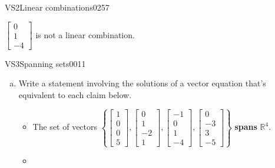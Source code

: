 \begin{exercise}{VS2}{Linear combinations}{0257}
\begin{exerciseAnswer}
\begin{itemize}
 

 \(\left[\begin{array}{c}
0 \\
1 \\
-4
\end{array}\right]\) is not a linear combination. 

 
\end{itemize}

     \end{exerciseAnswer}
 \end{exercise}


\newpage




\begin{exercise}{VS3}{Spanning sets}{0011} 
\begin{exerciseStatement} 

\begin{enumerate}[(a)]
\item  

 Write a statement involving the solutions of a vector equation that's equivalent to each claim below. 

 

\begin{itemize}
\item  

 The set of vectors \(\left\{ \left[\begin{array}{c}
1 \\
0 \\
0 \\
5
\end{array}\right] , \left[\begin{array}{c}
0 \\
1 \\
-2 \\
1
\end{array}\right] , \left[\begin{array}{c}
-1 \\
0 \\
1 \\
-4
\end{array}\right] , \left[\begin{array}{c}
0 \\
-3 \\
3 \\
-5
\end{array}\right] \right\}\) \textbf{spans} \(\mathbb R^4\). 

 
\item  


\end{itemize}
\end{enumerate}
\end{exerciseStatement}
\end{exercise}
